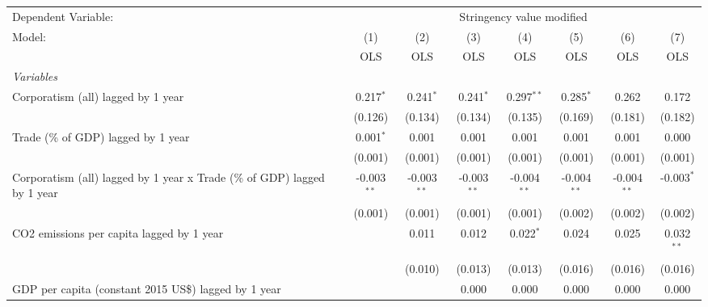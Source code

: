 
\begingroup
\centering
\begin{tabular}{lccccccc}
   \toprule
   Dependent Variable: & \multicolumn{7}{c}{Stringency value modified}\\
   Model:                                                                   & (1)           & (2)           & (3)           & (4)           & (5)           & (6)           & (7)\\  
                                                                            &  OLS          & OLS           & OLS           & OLS           & OLS           & OLS           & OLS\\  
   \midrule
   \emph{Variables}\\
   Corporatism (all) lagged by 1 year                                       & 0.217$^{*}$   & 0.241$^{*}$   & 0.241$^{*}$   & 0.297$^{**}$  & 0.285$^{*}$   & 0.262         & 0.172\\   
                                                                            & (0.126)       & (0.134)       & (0.134)       & (0.135)       & (0.169)       & (0.181)       & (0.182)\\   
   Trade (\% of GDP) lagged by 1 year                                       & 0.001$^{*}$   & 0.001         & 0.001         & 0.001         & 0.001         & 0.001         & 0.000\\   
                                                                            & (0.001)       & (0.001)       & (0.001)       & (0.001)       & (0.001)       & (0.001)       & (0.001)\\   
   Corporatism (all) lagged by 1 year x Trade (\% of GDP) lagged by 1 year  & -0.003$^{**}$ & -0.003$^{**}$ & -0.003$^{**}$ & -0.004$^{**}$ & -0.004$^{**}$ & -0.004$^{**}$ & -0.003$^{*}$\\   
                                                                            & (0.001)       & (0.001)       & (0.001)       & (0.001)       & (0.002)       & (0.002)       & (0.002)\\   
   CO2 emissions per capita lagged by 1 year                                &               & 0.011         & 0.012         & 0.022$^{*}$   & 0.024         & 0.025         & 0.032$^{**}$\\   
                                                                            &               & (0.010)       & (0.013)       & (0.013)       & (0.016)       & (0.016)       & (0.016)\\   
   GDP per capita (constant 2015 US\$) lagged by 1 year                     &               &               & 0.000         & 0.000         & 0.000         & 0.000         & 0.000\\   

\end{tabular}
